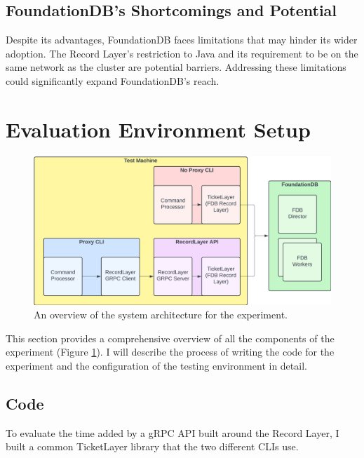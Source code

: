 \documentclass[sigconf]{acmart}
\begin{document}
\subsection{FoundationDB's Shortcomings and Potential}

Despite its advantages, FoundationDB faces limitations that may hinder its wider adoption. The Record Layer's restriction to Java and its requirement to be on the same network as the cluster are potential barriers. Addressing these limitations could significantly expand FoundationDB's reach.

\section{Evaluation Environment Setup}

\begin{figure}[t]
  \centering
  \includegraphics[width=\linewidth]{diag_system.png}
  \caption{An overview of the system architecture for the experiment.}
  \label{fig:diag_system}
\end{figure}

This section provides a comprehensive overview of all the components of the experiment (Figure \ref{fig:diag_system}). I will describe the process of writing the code for the experiment and the configuration of the testing environment in detail.

\subsection{Code}

To evaluate the time added by a gRPC API built around the Record Layer, I built a common TicketLayer library that the two different CLIs use.
\end{document}
